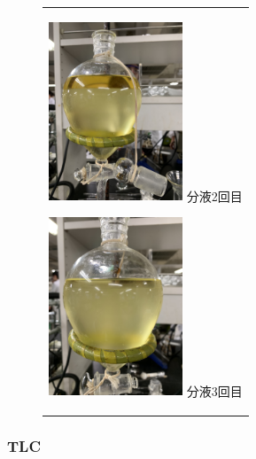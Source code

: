 \documentclass[a4paper,papersize,dvipdfmx]{jsarticle}
\begin{document}
\begin{figure}[H]
\begin{center}
\begin{tabular}{c}
\begin{minipage}{0.20\hsize}
\begin{center}
\includegraphics[clip, width=4cm]{imgs4/be3.jpg}
\hspace{1.6cm} 分液2回目
\end{center}
\end{minipage}

\begin{minipage}{0.05\hsize}
        \hspace{2mm}
      \end{minipage}

\begin{minipage}{0.20\hsize}
\begin{center}
\includegraphics[clip, width=4cm]{imgs4/be4.jpg}
\hspace{1.6cm} 分液3回目
\end{center}
\end{minipage}

\end{tabular}
\end{center}
\end{figure}


\subsubsection*{TLC}
\end{document}
